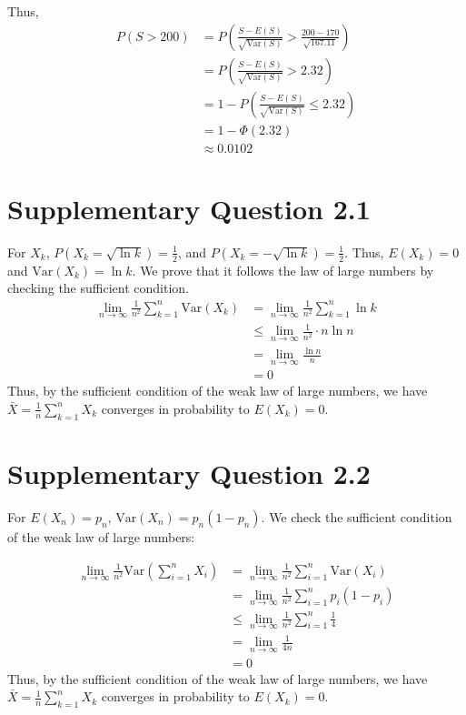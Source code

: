 \documentclass[a4paper, UTF-8]{article}
\theoremstyle{plain}
\begin{document}
Thus, 
\begin{align*}
P(S > 200) & = P\left(\frac{S - E(S)}{\sqrt{\text{Var}(S)}} > \frac{200 - 170}{\sqrt{167.11}}\right) \\
& = P\left(\frac{S - E(S)}{\sqrt{\text{Var}(S)}} > 2.32\right) \\
& = 1 - P\left(\frac{S - E(S)}{\sqrt{\text{Var}(S)}} \leq 2.32\right) \\
& = 1 - \Phi(2.32) \\
& \approx 0.0102
\end{align*}

\section{Supplementary Question 2.1}

For $X_k$, $P(X_k = \sqrt{\ln k}) = \frac{1}{2}$, and $P(X_k = -\sqrt{\ln k}) = \frac{1}{2}$. Thus, $E(X_k) = 0$ and $\text{Var}(X_k) = \ln k$. We prove that it follows the law of large numbers by checking the sufficient condition.
\begin{align*}
\lim_{n\to\infty} \frac{1}{n^2}\sum_{k=1}^{n} \text{Var}(X_k) & = \lim_{n\to\infty} \frac{1}{n^2}\sum_{k=1}^{n} \ln k \\
& \leq \lim_{n\to\infty} \frac{1}{n^2} \cdot n \ln n \\
& = \lim_{n\to\infty} \frac{\ln n}{n} \\
& = 0
\end{align*}
Thus, by the sufficient condition of the weak law of large numbers, we have $\bar{X} = \frac{1}{n}\sum_{k=1}^{n} X_k$ converges in probability to $E(X_k) = 0$.

\section{Supplementary Question 2.2} 

For $E(X_n) = p_n$, $\text{Var}(X_n) = p_n(1-p_n)$. We check the sufficient condition of the weak law of large numbers:

\begin{align*} 
\lim_{n \to \infty} \frac{1}{n^2} \text{Var}(\sum_{i=1}^{n} X_i) & = \lim_{n \to \infty} \frac{1}{n^2} \sum_{i=1}^{n} \text{Var}(X_i) \\
& = \lim_{n \to \infty} \frac{1}{n^2} \sum_{i=1}^{n} p_i(1-p_i) \\
& \leq \lim_{n \to \infty} \frac{1}{n^2} \sum_{i=1}^{n} \frac{1}{4} \\ 
&= \lim_{n \to \infty} \frac{1}{4n} \\
& = 0
\end{align*}
Thus, by the sufficient condition of the weak law of large numbers, we have $\bar{X} = \frac{1}{n}\sum_{k=1}^{n} X_k$ converges in probability to $E(X_k) = 0$.
\end{document}
